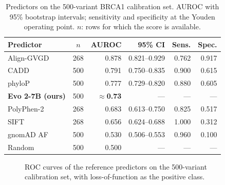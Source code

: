 \documentclass[conference,a4paper]{IEEEtran}
\def\rocCADD{(0.0000,0.0000) (0.0000,0.0300) (0.0000,0.0700) (0.0000,0.1700) (0.0025,0.1900) (0.0075,0.1900) (0.0200,0.2000) (0.0200,0.2300) (0.0300,0.2300) (0.0300,0.2400) (0.0375,0.2400) (0.0400,0.2400) (0.0425,0.2500) (0.0450,0.2500) (0.0525,0.2500) (0.0625,0.2500) (0.0650,0.2500) (0.0750,0.2500) (0.0750,0.2700) (0.0825,0.2800) (0.0875,0.2800) (0.0925,0.2900) (0.0950,0.3000) (0.1025,0.3000) (0.1125,0.3200) (0.1150,0.3200) (0.1175,0.3300) (0.1225,0.3400) (0.1225,0.3500) (0.1350,0.3500) (0.1375,0.4000) (0.1425,0.4200) (0.1525,0.4300) (0.1650,0.4700) (0.1675,0.4700) (0.1725,0.4800) (0.1750,0.4900) (0.1800,0.4900) (0.1925,0.5000) (0.1950,0.5100) (0.2050,0.5200) (0.2125,0.5300) (0.2175,0.5600) (0.2350,0.5700) (0.2450,0.6100) (0.2500,0.6400) (0.2550,0.6400) (0.2675,0.6700) (0.2700,0.6900) (0.2750,0.7000) (0.2825,0.7100) (0.2925,0.7400) (0.2975,0.7400) (0.3100,0.7600) (0.3150,0.7600) (0.3200,0.7700) (0.3225,0.7900) (0.3250,0.7900) (0.3325,0.8200) (0.3425,0.8400) (0.3500,0.8600) (0.3625,0.8600) (0.3700,0.8700) (0.3800,0.8700) (0.3825,0.8800) (0.3850,0.9000) (0.3900,0.9000) (0.4025,0.9000) (0.4050,0.9100) (0.4100,0.9200) (0.4225,0.9300) (0.4275,0.9300) (0.4300,0.9300) (0.4350,0.9300) (0.4375,0.9300) (0.4425,0.9300) (0.4450,0.9300) (0.4600,0.9300) (0.5150,0.9300) (0.5200,0.9300) (0.5725,0.9300) (0.5725,0.9400) (0.5800,0.9400) (0.5800,0.9500) (0.6025,0.9500) (0.6025,0.9600) (0.6075,0.9600) (0.6225,0.9600) (0.6250,0.9700) (0.6325,0.9700) (0.6325,0.9800) (0.6600,0.9800) (0.6650,0.9800) (0.6925,0.9800) (0.6975,0.9800) (0.7025,0.9800) (0.7075,0.9800) (0.7125,0.9800) (0.7175,0.9800) (0.7725,0.9800) (0.7775,0.9800) (0.9250,0.9800) (0.9250,0.9900) (0.9375,0.9900) (0.9375,1.0000) (0.9925,1.0000) (0.9975,1.0000) (1.0000,1.0000)}
\def\rocaGVD{(0.0000,0.0000) (0.0000,0.0476) (0.0049,0.0794) (0.0049,0.1746) (0.0098,0.1746) (0.0098,0.2222) (0.0146,0.2381) (0.0146,0.2857) (0.0341,0.2857) (0.0341,0.3810) (0.0341,0.4286) (0.0390,0.4286) (0.0390,0.4444) (0.0390,0.4762) (0.0390,0.4921) (0.0488,0.4921) (0.0488,0.5238) (0.0585,0.5238) (0.0585,0.5556) (0.0634,0.5714) (0.0634,0.6349) (0.0732,0.6349) (0.0732,0.6667) (0.0732,0.7302) (0.0780,0.7302) (0.0829,0.7460) (0.0829,0.7619) (0.1024,0.7619) (0.1122,0.7619) (0.1171,0.7619) (0.1268,0.7619) (0.1317,0.7619) (0.1317,0.7778) (0.1415,0.7778) (0.1463,0.7778) (0.1610,0.7778) (0.1707,0.7778) (0.1756,0.7778) (0.1756,0.7937) (0.1951,0.7937) (0.1951,0.8095) (0.2049,0.8095) (0.2146,0.8095) (0.2195,0.8095) (0.2195,0.8254) (0.2244,0.8254) (0.2341,0.8254) (0.2390,0.8571) (0.2488,0.8571) (0.2488,0.9048) (0.2585,0.9048) (0.2829,0.9048) (0.2927,0.9048) (0.3268,0.9048) (0.3317,0.9048) (0.3512,0.9048) (0.3561,0.9048) (0.3707,0.9048) (0.3805,0.9048) (0.3951,0.9048) (0.4146,0.9048) (0.4439,0.9048) (0.4634,0.9048) (0.5171,0.9048) (0.5171,0.9206) (0.5220,0.9206) (0.5220,0.9365) (0.5366,0.9365) (0.5512,0.9365) (0.5561,0.9365) (0.5707,0.9365) (0.5951,0.9365) (0.6049,0.9365) (0.6244,0.9365) (0.6341,0.9365) (0.6585,0.9365) (0.6585,0.9524) (0.6732,0.9524) (0.6878,0.9524) (0.7122,0.9524) (0.7268,0.9683) (0.7317,0.9683) (0.7463,0.9683) (0.7463,0.9841) (0.7561,0.9841) (0.7756,0.9841) (0.8000,0.9841) (0.8390,0.9841) (0.8488,0.9841) (0.8585,0.9841) (0.8585,1.0000) (0.8976,1.0000) (0.9073,1.0000) (0.9220,1.0000) (0.9268,1.0000) (0.9366,1.0000) (0.9463,1.0000) (0.9707,1.0000) (1.0000,1.0000)}
\def\rocphyloP{(0.0000,0.0000) (0.0400,0.1700) (0.1100,0.3300) (0.1175,0.3300) (0.2025,0.5200) (0.3950,0.8800) (0.4100,0.8800) (0.4400,0.8800) (0.4475,0.8800) (0.4500,0.9000) (0.4575,0.9000) (0.4600,0.9200) (0.4900,0.9200) (0.5025,0.9300) (0.5550,0.9300) (0.5650,0.9500) (0.5675,0.9700) (0.5900,0.9700) (0.6050,0.9700) (0.7325,0.9700) (0.7450,0.9800) (0.7825,0.9800) (0.7875,0.9900) (0.8400,0.9900) (0.8450,1.0000) (0.9725,1.0000) (0.9775,1.0000) (1.0000,1.0000)}
\def\rocPolyPhen2{(0.0000,0.0000) (0.0098,0.0000) (0.0341,0.0159) (0.0488,0.0476) (0.0537,0.0476) (0.0537,0.0794) (0.0878,0.1270) (0.1024,0.1429) (0.1073,0.1587) (0.1317,0.1746) (0.1317,0.1905) (0.1415,0.2381) (0.1561,0.2381) (0.1707,0.3175) (0.1756,0.3175) (0.1902,0.3333) (0.1951,0.3333) (0.1951,0.3810) (0.1951,0.3968) (0.2049,0.3968) (0.2293,0.4127) (0.2537,0.4444) (0.2585,0.4444) (0.2780,0.4921) (0.2829,0.5714) (0.2878,0.5714) (0.2976,0.5873) (0.2976,0.6349) (0.3024,0.6349) (0.3512,0.6349) (0.3512,0.6508) (0.3610,0.6508) (0.3610,0.6984) (0.3854,0.7143) (0.4000,0.7143) (0.4049,0.7143) (0.4146,0.7143) (0.4195,0.7143) (0.4244,0.7302) (0.4293,0.7302) (0.4341,0.7460) (0.4390,0.7460) (0.4634,0.7460) (0.4683,0.7460) (0.4683,0.7619) (0.4732,0.7619) (0.4829,0.7619) (0.4829,0.8254) (0.4976,0.8254) (0.5024,0.8254) (0.5268,0.8571) (0.5366,0.8571) (0.5366,0.8730) (0.5512,0.8730) (0.5610,0.8730) (0.5756,0.8730) (0.5756,0.8889) (0.5854,0.8889) (0.6098,0.8889) (0.6098,0.9048) (0.6195,0.9048) (0.6390,0.9048) (0.6439,0.9048) (0.6439,0.9206) (0.6537,0.9206) (0.6634,0.9206) (0.6732,0.9206) (0.6829,0.9206) (0.7171,0.9206) (0.7268,0.9206) (0.7366,0.9206) (0.7463,0.9206) (0.7512,0.9365) (0.7854,0.9365) (0.7951,0.9365) (0.8000,0.9365) (0.8146,0.9365) (0.8244,0.9365) (0.8341,0.9365) (0.8585,0.9365) (0.8585,0.9524) (0.8780,0.9524) (0.8927,0.9524) (0.8927,0.9683) (0.9122,0.9683) (0.9122,0.9841) (0.9415,0.9841) (0.9415,1.0000) (0.9561,1.0000) (0.9659,1.0000) (0.9805,1.0000) (1.0000,1.0000)}
\def\rocSIFT{(0.0000,0.0000) (0.6878,1.0000) (0.7463,1.0000) (0.7805,1.0000) (0.8049,1.0000) (0.8244,1.0000) (0.8341,1.0000) (0.8537,1.0000) (0.8634,1.0000) (0.8683,1.0000) (0.8878,1.0000) (0.9073,1.0000) (0.9220,1.0000) (0.9317,1.0000) (0.9463,1.0000) (0.9610,1.0000) (0.9902,1.0000) (1.0000,1.0000)}
\begin{document}
\begin{table}[!t]
\caption{Predictors on the 500-variant BRCA1 calibration set. AUROC with 95\% bootstrap intervals; sensitivity and specificity at the Youden operating point. $n$: rows for which the score is available.}
\label{tab:baselines}
\centering
\footnotesize
\setlength{\tabcolsep}{4pt}
\begin{tabular}{@{}lcrrrr@{}}
\toprule
Predictor & $n$ & AUROC & 95\% CI & Sens. & Spec. \\
\midrule
Align-GVGD & 268 & 0.878 & 0.821--0.929 & 0.762 & 0.917 \\
CADD & 500 & 0.791 & 0.750--0.835 & 0.900 & 0.615 \\
phyloP & 500 & 0.777 & 0.729--0.820 & 0.880 & 0.605 \\
\textbf{Evo 2-7B (ours)} & 500 & $\approx$\textbf{0.73} & --- & --- & --- \\
PolyPhen-2 & 268 & 0.683 & 0.613--0.750 & 0.825 & 0.517 \\
SIFT & 268 & 0.656 & 0.624--0.688 & 1.000 & 0.312 \\
gnomAD AF & 500 & 0.530 & 0.506--0.553 & 0.960 & 0.100 \\
\midrule
Random & 500 & 0.500 & --- & --- & --- \\
\bottomrule
\end{tabular}
\end{table}

\begin{figure}[!t]
\centering
{}
\caption{ROC curves of the reference predictors on the 500-variant calibration set, with loss-of-function as the positive class.}
\label{fig:roc}
\end{figure}
\end{document}
